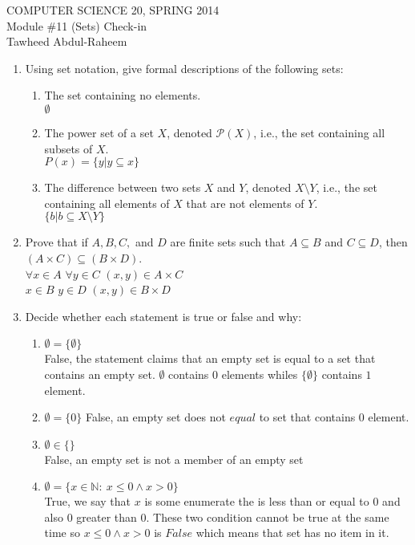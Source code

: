 \documentclass[12pt]{article}
\begin{document}
\begin{center}
COMPUTER SCIENCE 20, SPRING 2014 \\
\smallskip
Module \#11 (Sets) Check-in \\
Tawheed Abdul-Raheem
\end{center}

\begin{enumerate}
\item Using set notation, give formal descriptions of the following sets:
\begin{enumerate}
\item The set containing no elements. \\
    $\emptyset$
\item The power set of a set $X$, denoted $\mathcal{P}(X)$, i.e., the set containing all subsets of $X$. \\
    $P(x) = \{y | y \subseteq x \}$
\item The difference between two sets $X$ and $Y$, denoted $X\setminus Y$, i.e., the set containing all elements of $X$ that are not elements of $Y$.  \\
    $\{b | b \subseteq X \setminus Y\} $
\end{enumerate}
\item Prove that if $A, B, C,$ and $D$ are finite sets such that $A \subseteq B$ and $C \subseteq D$, then $(A \times C) \subseteq (B \times D)$. \\
    $\forall x \in A$ $\forall y \in C$       $(x,y) \in A \times C$ \\
    $x \in B $   $y \in D$                    $(x,y) \in B \times D$
\item Decide whether each statement is true or false and why:
\begin{enumerate}
\item $\emptyset = \{\emptyset\}$ \\
    False, the statement claims that an empty set is equal to a set that contains an empty set. $\emptyset$ contains $0$ elements whiles $\{ \emptyset \}$ contains $1$ element.
\item $\emptyset = \{0 \}$
    False, an empty set does not $equal$ to set that contains $0$ element.
\item $\emptyset \in \{\}$ \\
    False, an empty set is not a member of an empty set
\item $\emptyset = \{x \in \mathbb{N}:\ x \leq 0 \wedge x > 0\}$ \\
    True, we say that $x$ is some enumerate the is less than or equal to $0$ and also $0$ greater than $0$. These two condition cannot be true at the same time so $x \leq 0 \wedge x > 0$ is $False$ which means that set has no item in it.

\end{enumerate}
\end{enumerate}
\end{document}
